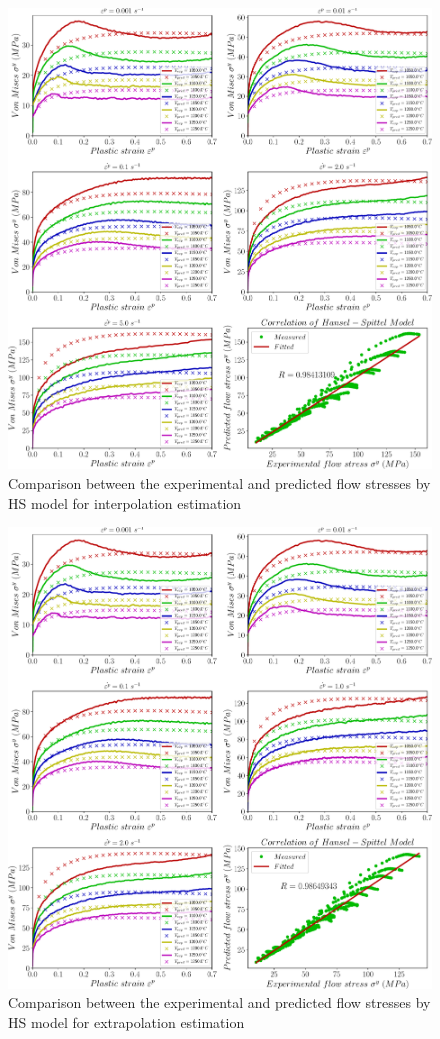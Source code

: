 \documentclass[twoside,english,1p,final,sort&compress]{elsarticle}
\theoremstyle{plain}
\begin{document}
\begin{figure}[!ht]
\centering
\includegraphics[width=1.02\columnwidth]
{newFigures/iCorrelationHS}
\caption{Comparison between the experimental and predicted flow stresses by HS model for interpolation estimation}
\label{fig:iCorrelationHS}
\end{figure}
\FloatBarrier
\begin{figure}[!ht]
\centering
\includegraphics[width=1.02\columnwidth]
{newFigures/eCorrelationHS}
\caption{Comparison between the experimental and predicted flow stresses by HS model for extrapolation estimation}
\label{fig:eCorrelationHS}
\end{figure}
\end{document}
